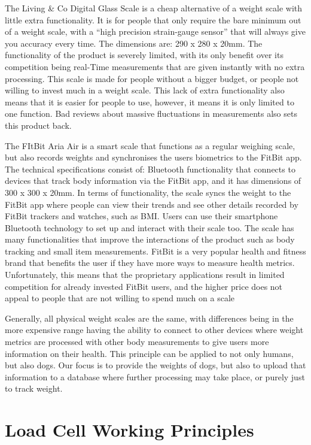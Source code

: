 The Living \& Co Digital Glass Scale is a cheap alternative of a weight scale with little extra functionality. It is for people that only require the bare minimum out of a weight scale, with a “high precision strain-gauge sensor” that will always give you accuracy every time. The dimensions are: 290 x 280 x 20mm. The functionality of the product is severely limited, with its only benefit over its competition being real-Time measurements that are given instantly with no extra processing. This scale is made for people without a bigger budget, or people not willing to invest much in a weight scale. This lack of extra functionality also means that it is easier for people to use, however, it means it is only limited to one function. Bad reviews about massive fluctuations in measurements also sets this product back.

The FItBit Aria Air is a smart scale that functions as a regular weighing scale, but also records weights and synchronises the users biometrics to the FitBit app. The technical specifications consist of: Bluetooth functionality that connects to devices that track body information via the FitBit app, and it has dimensions of 300 x 300 x 20mm. In terms of functionality, the scale syncs the weight to the FitBit app where people can view their trends and see other details recorded by FitBit trackers and watches, such as BMI. Users can use their smartphone Bluetooth technology to set up and interact with their scale too. The scale has many functionalities that improve the interactions of the product such as body tracking and small item measurements. FitBit is a very popular health and fitness brand that benefits the user if they have more ways to measure health metrics. Unfortunately, this means that the proprietary applications result in limited competition for already invested FitBit users, and the higher price does not appeal to people that are not willing to spend much on a scale

Generally, all physical weight scales are the same, with differences being in the more expensive range having the ability to connect to other devices where weight metrics are processed with other body measurements to give users more information on their health. This principle can be applied to not only humans, but also dogs. Our focus is to provide the weights of dogs, but also to upload that information to a database where further processing may take place, or purely just to track weight.


\section{Load Cell Working Principles}

